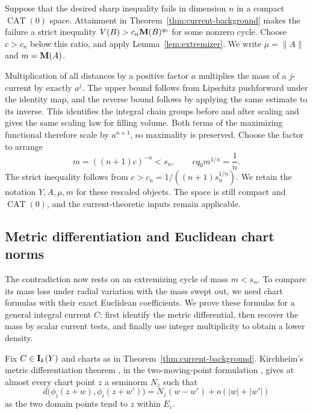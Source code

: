 Suppose that the desired sharp inequality fails in dimension \(n\) in
a compact \(\operatorname{CAT}(0)\) space. Attainment in
Theorem~\ref{thm:current-background} makes the failure a strict inequality
\(V(B)>c_n\mathbf M(B)^{q_0}\) for some nonzero cycle. Choose
\(c>c_n\) below this ratio, and apply Lemma~\ref{lem:extremizer}.
We write
\(\mu=\|A\|\) and \(m=\mathbf M(A)\).

Multiplication of all distances by a positive factor \(a\) multiplies
the mass of a \(j\)-current by exactly \(a^j\). The upper bound follows
from Lipschitz pushforward under the identity map, and the reverse bound
follows by applying the same estimate to its inverse. This identifies
the integral chain groups before and after scaling and gives the same
scaling law for filling volume. Both terms of the maximizing functional
therefore scale by \(a^{n+1}\), so maximality is preserved. Choose the
factor to arrange
\begin{equation}
\label{eq:normalization}
 m=((n+1)c)^{-n}<s_n,
 \qquad cq_0m^{1/n}=\frac1n.
\end{equation}
The strict inequality follows from
\(c>c_n=1/((n+1)s_n^{1/n})\).
We retain the notation \(Y,A,\mu,m\) for these rescaled objects. The
space is still compact and \(\operatorname{CAT}(0)\), and the
current-theoretic inputs remain applicable.

\subsection{Metric differentiation and Euclidean chart norms}

The contradiction now rests on an extremizing cycle of mass $m<s_n$.
To compare its mass loss under radial variation with the mass swept out,
we need chart formulas with their exact Euclidean coefficients. We prove
these formulas for a general integral current $C$: first identify the
metric differential, then recover the mass by scalar current tests, and
finally use integer multiplicity to obtain a lower density.

Fix \(C\in\mathbf I_k(Y)\) and charts as in
Theorem~\ref{thm:current-background}. Kirchheim's metric differentiation
theorem \cite[Theorem~2]{Kirchheim1994}, in the two-moving-point formulation
\cite[Definition~(1.3) and Theorem~1.1]{Duda2007}, gives at almost every
chart point \(z\) a seminorm \(N_z\) such that
\begin{equation}
\label{eq:two-point-metric-differential}
 d\bigl(\phi_i(z+w),\phi_i(z+w')\bigr)
 =N_z(w-w')+o(|w|+|w'|)
\end{equation}
as the two domain points tend to \(z\) within \(E_i\).

